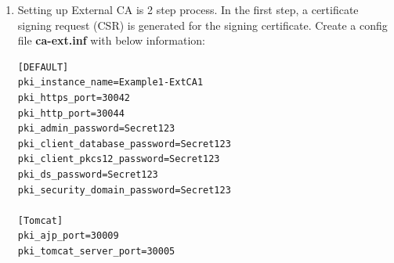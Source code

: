 \documentclass[a4paper]{article}
\begin{document}
\begin{enumerate}[label*=\arabic*.]
\begin{enumerate}[label*=\arabic*.]
\begin{lstlisting}[style=configFile]
[admin]
ServerAdminID=admin
ServerAdminPwd=Secret123
SysUser=nobody
                        \end{lstlisting}            
                        \begin{lstlisting}[style=bashInputStyle]
$ setup-ds.pl --silent --file=ca-ext-ds.inf --debug                        
                        \end{lstlisting}
                    \item \label{ca3.1} Setting up External CA is 2 step process.  In the first step, a certificate signing request (CSR) 
                        is generated for the signing certificate. Create a config file \textbf{ca-ext.inf} with below information:
                        \begin{lstlisting}[style=configFile]
[DEFAULT]
pki_instance_name=Example1-ExtCA1
pki_https_port=30042
pki_http_port=30044
pki_admin_password=Secret123
pki_client_database_password=Secret123
pki_client_pkcs12_password=Secret123
pki_ds_password=Secret123
pki_security_domain_password=Secret123

[Tomcat]
pki_ajp_port=30009
pki_tomcat_server_port=30005


\end{lstlisting}
\end{enumerate}
\end{enumerate}
\end{document}

